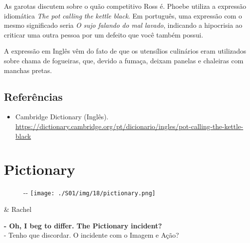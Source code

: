 As garotas discutem sobre o quão competitivo Ross é. Phoebe utiliza a
expressão idiomática \emph{The pot calling the kettle black}. Em
português, uma expressão com o mesmo significado seria \emph{O sujo
falando do mal lavado}, indicando a hipocrisia ao criticar uma outra
pessoa por um defeito que você também possui.

A expressão em Inglês vêm do fato de que os utensílios culinários eram
utilizados sobre chama de fogueiras, que, devido a fumaça, deixam
panelas e chaleiras com manchas pretas.

\hypertarget{referuxeancias-8}{%
\subsection{Referências}\label{referuxeancias-8}}

\begin{itemize}
\tightlist
\item
  \sloppy Cambridge Dictionary (Inglês). \url{https://dictionary.cambridge.org/pt/dicionario/ingles/pot-calling-the-kettle-black}
\end{itemize}

\hypertarget{pictionary}{%
\section{Pictionary}\label{pictionary}}

\begin{figure}[!ht]
  \begin{adjustwidth}{-\oddsidemargin-1in}{-\rightmargin}
    \centering
    \texttt{[image: ./S01/img/18/pictionary.png]}
  \end{adjustwidth}
\end{figure}

\begin{tcolorbox}[enhanced,center upper,
    drop fuzzy shadow southeast, boxrule=0.3pt,
    lower separated=false, breakable,
    colframe=black!30!dialogoBorder,colback=white]
\begin{minipage}[c]{0.16\linewidth}
   & \centering \scriptsize{Rachel}
\end{minipage}
\hfill
\begin{minipage}[c]{0.8\linewidth}
  \textbf{- Oh, I beg to differ. The Pictionary incident?}\\
  - Tenho que discordar. O incidente com o Imagem e Ação?
\end{minipage}
\end{tcolorbox}

